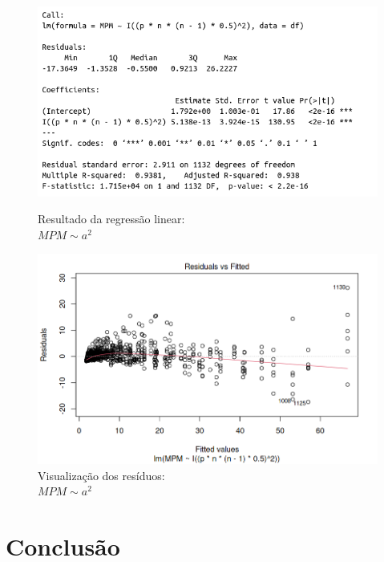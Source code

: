 \documentclass{uofa-eng-assignment}
\begin{document}
\begin{figure}[h]
    \centering
    \begin{minipage}{0.45\textwidth}
        \centering
        \includegraphics[width=1.1\textwidth]{mpm_a^2_lm.png}
        \captionsetup{justification=centering}
        \caption{Resultado da regressão linear: \\$MPM \sim a^2$}
        \label{fig:mpm-regression-2}
    \end{minipage}
    \hfill
    \begin{minipage}{0.45\textwidth}
        \centering
        \includegraphics[width=1.1\textwidth]{mpm_a^2_residuals.png}
        \captionsetup{justification=centering}
        \caption{Visualização dos resíduos: \\$MPM \sim a^2$}
        \label{fig:mpm-residuals}
    \end{minipage}
\end{figure}




\WFclear
\newpage
\section{Conclusão}
\end{document}
